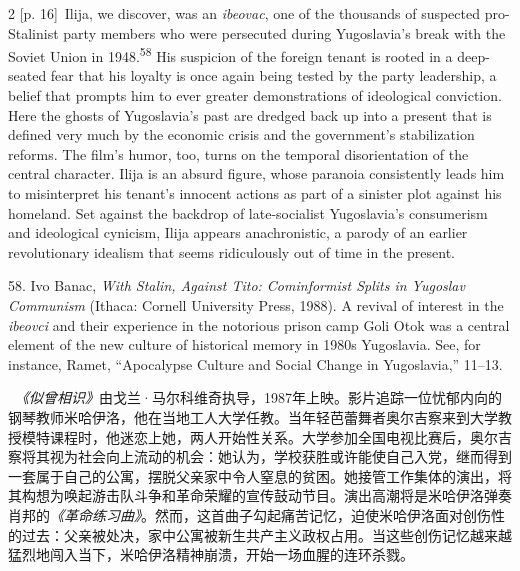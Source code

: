 \documentclass[10pt,a4paper]{article}
\begin{document}
\begin{paracol}{2}
\switchcolumn
{\scriptsize\color{gray} [p. 16]}\ Ilija, we discover, was an \textit{ibeovac}, one of the thousands of suspected pro-Stalinist party members who were persecuted during Yugoslavia’s break with the Soviet Union in 1948.\nobreak\textsuperscript{58} His suspicion of the foreign tenant is rooted in a deep-seated fear that his loyalty is once again being tested by the party leadership, a belief that prompts him to ever greater demonstrations of ideological conviction. Here the ghosts of Yugoslavia’s past are dredged back up into a present that is defined very much by the economic crisis and the government’s stabilization reforms. The film’s humor, too, turns on the temporal disorientation of the central character. Ilija is an absurd figure, whose paranoia consistently leads him to misinterpret his tenant’s innocent actions as part of a sinister plot against his homeland. Set against the backdrop of late-socialist Yugoslavia’s consumerism and ideological cynicism, Ilija appears anachronistic, a parody of an earlier revolutionary idealism that seems ridiculously out of time in the present.\par{\small 58. Ivo Banac, \textit{With Stalin, Against Tito: Cominformist Splits in Yugoslav Communism} (Ithaca: Cornell University Press, 1988). A revival of interest in the \textit{ibeovci} and their experience in the notorious prison camp Goli Otok was a central element of the new culture of historical memory in 1980s Yugoslavia. See, for instance, Ramet, “Apocalypse Culture and Social Change in Yugoslavia,” 11–13.\par}
\switchcolumn*
{\scriptsize\color{gray} [p. 16]}\ \textit{《似曾相识》}由戈兰·马尔科维奇执导，1987年上映。影片追踪一位忧郁内向的钢琴教师米哈伊洛，他在当地工人大学任教。当年轻芭蕾舞者奥尔吉察来到大学教授模特课程时，他迷恋上她，两人开始性关系。大学参加全国电视比赛后，奥尔吉察将其视为社会向上流动的机会：她认为，学校获胜或许能使自己入党，继而得到一套属于自己的公寓，摆脱父亲家中令人窒息的贫困。她接管工作集体的演出，将其构想为唤起游击队斗争和革命荣耀的宣传鼓动节目。演出高潮将是米哈伊洛弹奏肖邦的\textit{《革命练习曲》}。然而，这首曲子勾起痛苦记忆，迫使米哈伊洛面对创伤性的过去：父亲被处决，家中公寓被新生共产主义政权占用。当这些创伤记忆越来越猛烈地闯入当下，米哈伊洛精神崩溃，开始一场血腥的连环杀戮。\par
\switchcolumn

\end{paracol}
\end{document}
